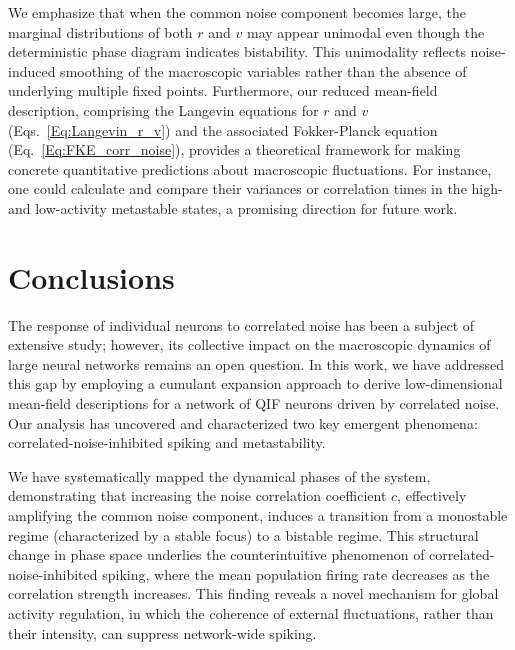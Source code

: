 \documentclass[aps,twocolumn,pre]{revtex4-2}
\begin{document}
We emphasize that when the common noise component becomes large, the marginal distributions of both $r$ and $v$ may appear unimodal even though the deterministic phase diagram indicates bistability. This unimodality reflects noise-induced smoothing of the macroscopic variables rather than the absence of underlying multiple fixed points. Furthermore, our reduced mean-field description, comprising the Langevin equations for $r$ and $v$ (Eqs.~\eqref{Eq:Langevin_r_v}) and the associated Fokker-Planck equation (Eq.~\eqref{Eq:FKE_corr_noise}), provides a theoretical framework for making concrete quantitative predictions about macroscopic fluctuations. For instance, one could calculate and compare their variances or correlation times in the high- and low-activity metastable states, a promising direction for future work.


\section{Conclusions}
The response of individual neurons to correlated noise has been a subject of extensive study; however, its collective impact on the macroscopic dynamics of large neural networks remains an open question. In this work, we have addressed this gap by employing a cumulant expansion approach to derive low-dimensional mean-field descriptions for a network of QIF neurons driven by correlated noise. Our analysis has uncovered and characterized two key emergent phenomena: correlated-noise-inhibited spiking and metastability.

We have systematically mapped the dynamical phases of the system, demonstrating that increasing the noise correlation coefficient $c$, effectively amplifying the common noise component, induces a transition from a monostable regime (characterized by a stable focus) to a bistable regime. This structural change in phase space underlies the counterintuitive phenomenon of correlated-noise-inhibited spiking, where the mean population firing rate decreases as the correlation strength increases. This finding reveals a novel mechanism for global activity regulation, in which the coherence of external fluctuations, rather than their intensity, can suppress network-wide spiking.
\end{document}
